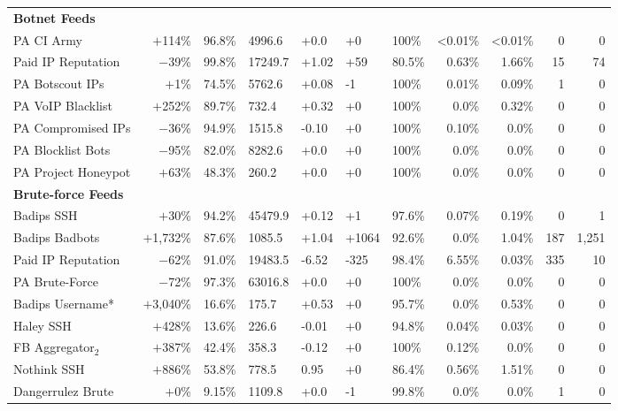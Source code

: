 \begin{table}[t!]
\begin{tabular}{l r H H H H H r r r r }
  \textbf{Botnet Feeds} \\
  PA CI Army 	            & $+$114\%   & 96.8\% 	& 4996.6  & +0.0     & +0    & 100\%  & <0.01\%  & <0.01\% & 0    & 0\\
  Paid IP Reputation 	    & $-$39\%   & 99.8\% 	& 17249.7 & +1.02    & +59   & 80.5\% & 0.63\%   & 1.66\%  & 15    & 74\\
  PA Botscout IPs 	        & $+$1\%    & 74.5\% 	& 5762.6  & +0.08    & -1    & 100\% & 0.01\%    & 0.09\%  & 1     & 0\\
  PA VoIP Blacklist 	    & $+$252\%   & 89.7\% 	& 732.4   & +0.32  	 & +0    & 100\% & 0.0\%     & 0.32\%  & 0    & 0\\
  PA Compromised IPs 	    & $-$36\%   & 94.9\% 	& 1515.8  & -0.10 	 & +0    & 100\% & 0.10\%    & 0.0\%   & 0   & 0\\
  PA Blocklist Bots 	    & $-$95\%	  & 82.0\% 	& 8282.6  & +0.0     & +0    & 100\% & 0.0\%     & 0.0\%   & 0    & 0 \\
  PA Project Honeypot 	    & $+$63\%	  & 48.3\% 	& 260.2   & +0.0     & +0    & 100\% & 0.0\%     & 0.0\%   & 0    & 0 \\

  \textbf{Brute-force Feeds} \\
   Badips SSH 	             & $+$30\%   & 94.2\% 	& 45479.9   & +0.12    & +1     & 97.6\% & 0.07\%      & 0.19\% & 0   & 1    \\
   Badips Badbots 	         & $+$1,732\%    & 87.6\%     & 1085.5    & +1.04    & +1064  & 92.6\% & 0.0\%      & 1.04\%  & 187 & 1,251   \\
   Paid IP Reputation 	     & $-$62\%   & 91.0\% 	& 19483.5   & -6.52    & -325   & 98.4\% & 6.55\%    & 0.03\%   & 335 & 10  \\
   PA Brute-Force 	         & $-$72\%   & 97.3\% 	& 63016.8   & +0.0     & +0     & 100\%  & 0.0\%      & 0.0\%   & 0   & 0  \\
   Badips Username*          & $+$3,040\%    & 16.6\% 	& 175.7     & +0.53    & +0     & 95.7\% & 0.0\%     & 0.53\% 	& 0  & 0\\
   Haley SSH 	             & $+$428\%   & 13.6\% 	& 226.6     & -0.01    & +0     & 94.8\% & 0.04\% 	& 0.03\%    & 0  & 0\\
   FB Aggregator$_2$ 	     & $+$387\%   & 42.4\% 	& 358.3     & -0.12    & +0     & 100\%  & 0.12\% 	& 0.0\%     & 0  & 0\\
   Nothink SSH 	             & $+$886\%   & 53.8\% 	& 778.5     & 0.95     & +0     & 86.4\% & 0.56\%	& 1.51\%    & 0  & 0\\
   Dangerrulez Brute 	     & $+$0\%	   & 9.15\% 	& 1109.8    & +0.0     & -1     & 99.8\% & 0.0\%    & 0.0\% 	& 1  & 0 \\


\end{tabular}
\end{table}
